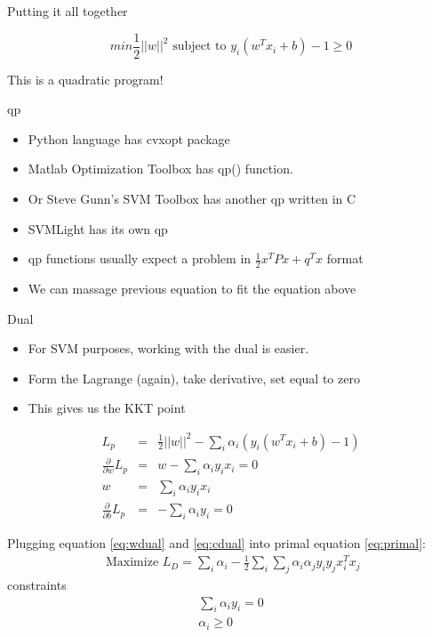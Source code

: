 \documentclass[12pt,fleqn]{article}\usepackage{../common}
\begin{document}
Putting it all together

\begin{equation}
  min \frac{1}{2}{||w||^2} \textrm{ subject to }  y_{i}(w^Tx_{i}+b)-1 \ge 0 \nonumber
\end{equation}

This is a quadratic program!

qp

\begin{itemize}
   \item Python language has cvxopt package
   \item Matlab Optimization Toolbox has qp() function.
   \item Or Steve Gunn's SVM Toolbox has another qp written in C
   \item SVMLight has its own qp
   \item qp functions usually expect a problem in $\frac{1}{2}x^{T}Px+q^{T}x$
   format
   \item We can massage previous equation to fit the equation above
\end{itemize}


Dual

\begin{itemize}
   \item For SVM purposes, working with the dual  is easier.
   \item Form the Lagrange (again), take derivative, set equal to zero
   \item This gives us the KKT point
\end{itemize}

\begin{eqnarray}
L_{p} &=& \frac{1}{2}||w||^{2}-\sum_{i}\alpha_{i}(y_{i}(w^{T}x_{i}+b)-1)  \label{eq:primal}\\
\frac{\partial}{\partial w} L_{p} &=& w-\sum_{i}\alpha_{i}y_{i}x_{i}=0 \nonumber \\
w &=& \sum_{i}\alpha_{i}y_{i}x_{i} \label{eq:wdual} \\
\frac{\partial}{\partial b} L_{p} &=& -\sum_{i}\alpha_{i}y_{i}=0  \label{eq:cdual}
\end{eqnarray}

Plugging equation \ref{eq:wdual} and \ref{eq:cdual} into primal equation \ref{eq:primal}:
\begin{eqnarray}
\textrm{ Maximize } L_{D}=\sum_{i}\alpha_{i}-\frac{1}{2}\sum_{i}\sum_{j}\alpha_{i}\alpha_{j}y_{i}y_{j}x_{i}^{T}x_{j} \label{eq:svm}
\end{eqnarray}
constraints
\begin{eqnarray*}
\sum_{i}\alpha_{i}y_{i}=0 \nonumber \\
\alpha_{i} \geq 0 \nonumber
\end{eqnarray*}
\end{document}
